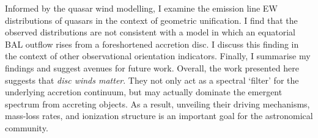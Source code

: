 \documentclass[a4paper, 11pt, twoside]{Thesis}  %
\begin{document}
{Informed by the quasar wind modelling, I examine the emission line EW distributions
of quasars in the context of geometric unification. I find that the observed 
distributions are not consistent with a model in which an equatorial BAL 
outflow rises from a foreshortened accretion disc. I discuss this finding
in the context of other observational orientation indicators.
Finally, I summarise my findings and suggest avenues for future work.
Overall, the work presented here suggests that {\em disc winds matter}. 
They not only act as a spectral `filter' for the underlying
accretion continuum, but may actually dominate the emergent spectrum from 
accreting objects. As a result, unveiling their driving mechanisms, 
mass-loss rates, and ionization structure is an important goal for the 
astronomical community. 
}

\cleardoublepage  %



\pagestyle{fancy}  %


\tableofcontents  %

\listoffigures  %

\listoftables  %

\end{document}
